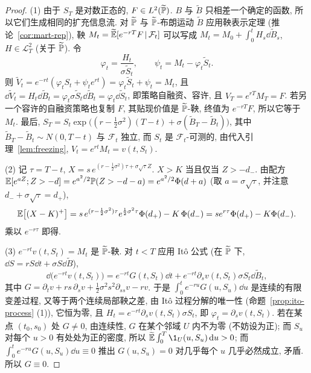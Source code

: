 \begin{proof}
(1) 由于 $S_T$ 是对数正态的, $F\in L^2(\widetilde{\P})$. $B$ 与 $\widetilde{B}$ 只相差一个确定的函数, 所以它们生成相同的扩充信息流. 对 $\widetilde{\P}$ 与 $\widetilde{\P}$-布朗运动 $\widetilde{B}$ 应用鞅表示定理 (推论~\ref{cor:mart-rep}), 鞅 $M_t=\widetilde{\E}[e^{-rT}F\,|\,\mathcal{F}_t]$ 可以写成 $M_t=M_0+\int_0^tH_s\dd\widetilde{B}_s$, $H\in\mathscr{L}^2_T$ (关于 $\widetilde{\P}$). 令
\[
\varphi_t=\frac{H_t}{\sigma\widetilde{S}_t},\qquad\psi_t=M_t-\varphi_t\widetilde{S}_t.
\]
则 $\widetilde{V}_t=e^{-rt}(\varphi_tS_t+\psi_te^{rt})=\varphi_t\widetilde{S}_t+\psi_t=M_t$, 且 $\dd\widetilde{V}_t=H_t\dd\widetilde{B}_t=\varphi_t\sigma\widetilde{S}_t\dd\widetilde{B}_t=\varphi_t\dd\widetilde{S}_t$, 即策略自融资、容许, 且 $V_T=e^{rT}M_T=F$. 若另一个容许的自融资策略也复制 $F$, 其贴现价值是 $\widetilde{\P}$-鞅, 终值为 $e^{-rT}F$, 所以它等于 $M_t$. 最后, $S_T=S_t\exp\big((r-\frac{1}{2}\sigma^2)(T-t)+\sigma(\widetilde{B}_T-\widetilde{B}_t)\big)$, 其中 $\widetilde{B}_T-\widetilde{B}_t\sim N(0,T-t)$ 与 $\mathcal{F}_t$ 独立, 而 $S_t$ 是 $\mathcal{F}_t$-可测的, 由代入引理~\ref{lem:freezing}, $V_t=e^{rt}M_t=v(t,S_t)$.

(2) 记 $\tau=T-t$, $X=s\,e^{(r-\frac{1}{2}\sigma^2)\tau+\sigma\sqrt{\tau}Z}$. $X>K$ 当且仅当 $Z>-d_-$. 由配方 $\E[e^{aZ};Z>-d]=e^{a^2/2}\P(Z>-d-a)=e^{a^2/2}\Phi(d+a)$ (取 $a=\sigma\sqrt{\tau}$, 并注意 $d_-+\sigma\sqrt{\tau}=d_+$),
\[
\E\big[(X-K)^+\big]=s\,e^{(r-\frac{1}{2}\sigma^2)\tau}e^{\frac{1}{2}\sigma^2\tau}\Phi(d_+)-K\,\Phi(d_-)=se^{r\tau}\Phi(d_+)-K\Phi(d_-).
\]
乘以 $e^{-r\tau}$ 即得.

(3) $e^{-rt}v(t,S_t)=M_t$ 是 $\widetilde{\P}$-鞅. 对 $t<T$ 应用 It\^o 公式 (在 $\widetilde{\P}$ 下, $\dd S=rS\dd t+\sigma S\dd\widetilde{B}$),
\[
\dd\big(e^{-rt}v(t,S_t)\big)=e^{-rt}G(t,S_t)\dd t+e^{-rt}\partial_sv(t,S_t)\sigma S_t\dd\widetilde{B}_t,
\]
其中 $G=\partial_tv+rs\,\partial_sv+\frac{1}{2}\sigma^2s^2\partial_{ss}v-rv$.
于是 $\int_0^te^{-ru}G(u,S_u)\dd u$ 是连续的有限变差过程, 又等于两个连续局部鞅之差, 由 It\^o 过程分解的唯一性 (命题~\ref{prop:ito-process} (1)), 它恒为零, 且 $H_t=e^{-rt}\partial_sv(t,S_t)\sigma S_t$, 即 $\varphi_t=\partial_sv(t,S_t)$. 若在某点 $(t_0,s_0)$ 处 $G\ne0$, 由连续性, $G$ 在某个邻域 $U$ 内不为零 (不妨设为正); 而 $S_u$ 对每个 $u>0$ 有处处为正的密度, 所以 $\widetilde{\E}\int_0^{T}\1_U(u,S_u)\dd u>0$; 而 $\int_0^te^{-ru}G(u,S_u)\dd u\equiv0$ 推出 $G(u,S_u)=0$ 对几乎每个 $u$ 几乎必然成立, 矛盾. 所以 $G\equiv0$.
\end{proof}

